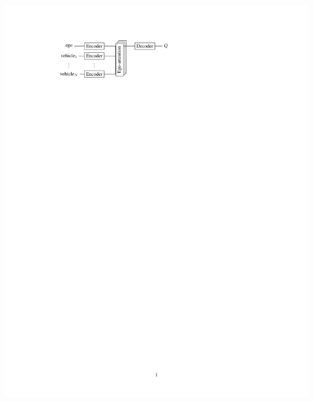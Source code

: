 \documentclass[paperwidth=36in,paperheight=48in,portrait,fontscale=0.3, margin=2cm]{baposter}
\begin{document}
\begin{poster}
{\begin{center}
\begin{minipage}{0.59\textwidth}
		\includegraphics[trim={3.8cm 18.3cm 5.8cm 2.5cm}, clip, page=2, width=\linewidth]{img/architecture}
	\end{minipage}


\end{center}

}


\end{poster}
\end{document}
